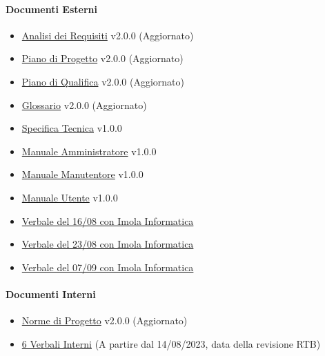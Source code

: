 \documentclass[12pt, a4paper]{article}
\begin{document}
\paragraph{Documenti Esterni}
\begin{itemize}
    \item \href{https://github.com/4ourSquared/LumosMinima/tree/main/public/esterni/analisi_dei_requisiti_v2.0.0.pdf}{Analisi dei Requisiti} v2.0.0 (Aggiornato)
    \item \href{https://github.com/4ourSquared/LumosMinima/tree/main/public/esterni/piano_di_progetto_v2.0.0.pdf}{Piano di Progetto} v2.0.0 (Aggiornato)
    \item \href{https://github.com/4ourSquared/LumosMinima/tree/main/public/esterni/piano_di_qualifica_v2.0.0.pdf}{Piano di Qualifica} v2.0.0 (Aggiornato)
    \item \href{https://github.com/4ourSquared/LumosMinima/tree/main/public/esterni/glossario_v2.0.0.pdf}{Glossario} v2.0.0 (Aggiornato)
    \item \href{https://github.com/4ourSquared/LumosMinima/tree/main/public/esterni/specifica_tecnica_v1.0.0.pdf}{Specifica Tecnica} v1.0.0
    \item \href{https://github.com/4ourSquared/LumosMinima/tree/main/public/esterni/manuale_amministratore_v1.0.0.pdf}{Manuale Amministratore} v1.0.0
    \item \href{https://github.com/4ourSquared/LumosMinima/tree/main/public/esterni/manuale_manutentore_v1.0.0.pdf}{Manuale Manutentore} v1.0.0
    \item \href{https://github.com/4ourSquared/LumosMinima/tree/main/public/esterni/manuale_utente_v1.0.0.pdf}{Manuale Utente} v1.0.0
    \item \href{https://github.com/4ourSquared/LumosMinima/tree/main/public/esterni/verbali/2023_08_16_E.pdf}{Verbale del 16/08 con Imola Informatica}
    \item \href{https://github.com/4ourSquared/LumosMinima/tree/main/public/esterni/verbali/2023_08_23_E.pdf}{Verbale del 23/08 con Imola Informatica}
    \item \href{https://github.com/4ourSquared/LumosMinima/tree/main/public/esterni/verbali/2023_09_07_E.pdf}{Verbale del 07/09 con Imola Informatica}
\end{itemize}
\paragraph{Documenti Interni}
\begin{itemize}
    \item \href{https://github.com/4ourSquared/LumosMinima/tree/main/public/interni/norme_di_progetto_v2.0.0.pdf}{Norme di Progetto} v2.0.0 (Aggiornato)
    \item \href{https://github.com/4ourSquared/LumosMinima/tree/main/public/interni/verbali}{6 Verbali Interni} (A partire dal 14/08/2023, data della revisione RTB)
\end{itemize}
\end{document}
